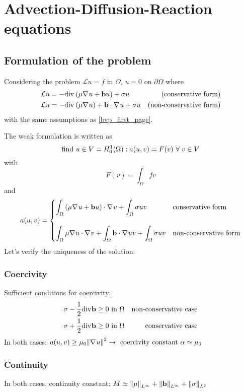 \newpage
\section{Advection-Diffusion-Reaction equations}
\subsection{Formulation of the problem}
Considering the problem \(\mathcal{L}u = f\) in \(\Omega\), \(u=0\) on \(\partial\Omega\) where 
\begin{align*}
    &\mathcal{L} u = -\text{div}\mspace{1mu} \left(\mu \nabla\mspace{1mu} u + \textbf{b} u\right) + \sigma u & \text{(conservative form)} \\
    &\mathcal{L} u = -\text{div}\mspace{1mu} \left(\mu \nabla\mspace{1mu} u\right) + \textbf{b} \cdot \nabla\mspace{1mu} u + \sigma u & \text{(non-conservative form)}
\end{align*}
with the same assumptions as \eqref{bvp_first_page}. 

The weak formulation is written as 
\begin{equation}
    \text{find } u \in V = H^1_0(\Omega) : a(u,v) = F(v) \ \forall \; v \in V
    \label{weak_formulation_adr}
\end{equation}
with 
\[
    F(v) = \int_\Omega fv
\]
and 
\[
    a(u,v) = \begin{cases}
        \displaystyle\int_\Omega \left( \mu \nabla\mspace{1mu} u + \textbf{b} u \right) \cdot \nabla\mspace{1mu} v + \int_\Omega \sigma u v & \text{conservative form} \\
        \\
        \displaystyle\int_\Omega \mu \nabla\mspace{1mu} u \cdot \nabla\mspace{1mu} v + \int_\Omega \textbf{b} \cdot \nabla\mspace{1mu} u v + \int_\Omega \sigma u v & \text{non-conservative form}
    \end{cases}
\]
Let's verify the uniqueness of the solution:
\subsubsection*{Coercivity}
Sufficient conditions for coercivity:
\begin{align*}
    &\sigma - \frac{1}{2} \text{div}\mspace{1mu} \textbf{b} \geq 0 \text{ in } \Omega & \text{non-conservative case} \\
    &\sigma + \frac{1}{2} \text{div}\mspace{1mu} \textbf{b} \geq 0 \text{ in } \Omega & \text{conservative case}  
\end{align*}
In both cases: \(a(u,v) \geq \mu_0\norm{\nabla\mspace{1mu} u}^2 \rightarrow \text{ coercivity constant } \alpha \simeq \mu_0\)
\subsubsection*{Continuity}
In both cases, continuity constant: \(M \simeq \norm{\mu}_{L^\infty} + \norm{\textbf{b}}_{L^\infty} + \norm{\sigma}_{L^2}\)

